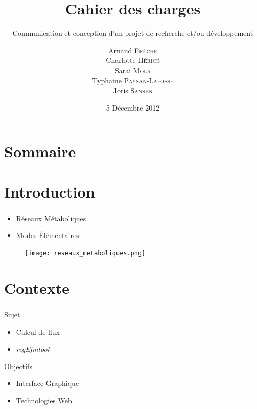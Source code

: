 \documentclass[11pt]{beamer}
\title{\textbf{Cahier des charges}}
\subtitle{Communication et conception d'un projet de recherche et/ou développement}
\date{5 Décembre 2012}
\author{Arnaud \textsc{Frèche} \\ Charlotte \textsc{Héricé} \\ Sarai \textsc{Mola}\\ Typhaine  \textsc{Paysan-Lafosse} \\ Joris \textsc{Sansen}}
\institute[Université Bordeaux 1] {Master 2 BioInformatique}
\begin{document}
\frame{\titlepage}

\section*{Sommaire}

\begin{frame}
  \tableofcontents
\end{frame}

\section{Introduction}			

\begin{frame}
	\frametitle{\secname}
	\begin{minipage}{5cm}
		\begin{block}{}
			\begin{itemize}
				\item Réseaux Métaboliques
				\item Modes Élémentaires
			\end{itemize}
		\end{block}
	\end{minipage}
	\begin{minipage}{5cm}
		\begin{figure}[h]
			\begin{center}
   				\begin{minipage}[c]{0.9\textwidth}
  					\texttt{[image: reseaux\_metaboliques.png]}
				 \end{minipage}%
  			\end{center}	
		 \end{figure}
	\end{minipage}
\end{frame}

\section{Contexte}			

\begin{frame}
	\frametitle{\secname}
	\begin{block}{Sujet}
		\begin{itemize}
		\item Calcul de flux
		\item \textit{regEfmtool}
		\end{itemize}
	\end{block}
	\begin{block}{Objectifs}
		\begin{itemize}
		\item Interface Graphique
		\item Technologies Web
		\end{itemize}
	\end{block}
\end{frame}
\end{document}

